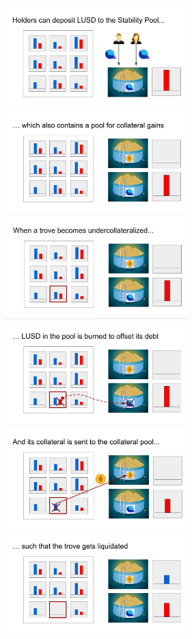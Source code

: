 \documentclass{article}
\begin{document}
\begin{figure}[h]
\centering
\includegraphics[width=7cm]{a5.png}
\includegraphics[width=7cm]{a6.png}
\includegraphics[width=7cm]{a7.png}
\includegraphics[width=7cm]{a8.png}
\includegraphics[width=7cm]{a9.png}
\includegraphics[width=7cm]{a10.png}
\end{figure}
\end{document}
